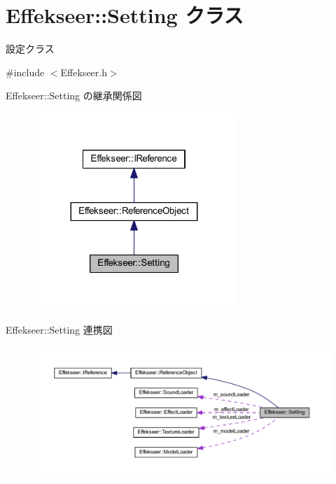 \hypertarget{class_effekseer_1_1_setting}{}\section{Effekseer\+:\+:Setting クラス}
\label{class_effekseer_1_1_setting}


設定クラス  




{\ttfamily \#include $<$Effekseer.\+h$>$}



Effekseer\+:\+:Setting の継承関係図\nopagebreak
\begin{figure}[H]
\begin{center}
\leavevmode
\includegraphics[width=215pt]{class_effekseer_1_1_setting__inherit__graph}
\end{center}
\end{figure}


Effekseer\+:\+:Setting 連携図\nopagebreak
\begin{figure}[H]
\begin{center}
\leavevmode
\includegraphics[width=350pt]{class_effekseer_1_1_setting__coll__graph}
\end{center}
\end{figure}
